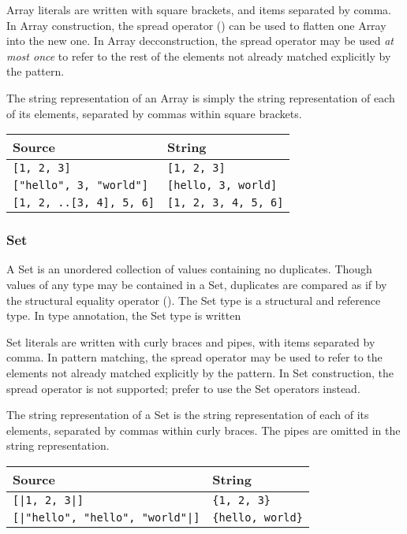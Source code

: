 Array literals are written with square brackets, and items separated by
comma. In Array construction, the spread operator () can be used
to flatten one Array into the new one. In Array decconstruction, the spread
operator may be used \emph{at most once} to refer to the rest of the elements
not already matched explicitly by the pattern.

The string representation of an Array is simply the string representation of
each of its elements, separated by commas within square brackets.

\begin{table}[H]
    \centering
    \begin{tabular}{ll}
        \hline
        \textbf{Source} & \textbf{String} \\
        \hline
        \texttt{[1, 2, 3]} & \texttt{[1, 2, 3]} \\
        \texttt{["hello", 3, "world"]} & \texttt{[hello, 3, world]} \\
        \texttt{[1, 2, ..[3, 4], 5, 6]} & \texttt{[1, 2, 3, 4, 5, 6]} \\
        \hline
    \end{tabular}
\end{table}

\subsubsection{Set}

A Set is an unordered collection of values containing no duplicates. Though
values of any type may be contained in a Set, duplicates are compared as if
by the structural equality operator (). The Set type is a structural
and reference type. In type annotation, the Set type is written 

Set literals are written with curly braces and pipes, with items separated by comma.
In pattern matching, the spread operator may be used to refer to the elements
not already matched explicitly by the pattern. In Set construction, the
spread operator is not supported; prefer to use the Set operators instead.

The string representation of a Set is the string representation of
each of its elements, separated by commas within curly braces. The pipes
are omitted in the string representation.

\begin{table}[H]
    \centering
    \begin{tabular}{ll}
        \hline
        \textbf{Source} & \textbf{String} \\
        \hline
        \texttt{[|1, 2, 3|]} & \texttt{\{1, 2, 3\}} \\
        \texttt{[|"hello", "hello", "world"|]} & \texttt{\{hello, world\}} \\
        \hline
    \end{tabular}
\end{table}

